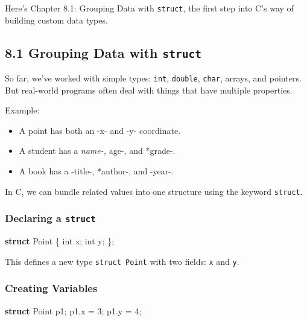 \documentclass[
  letterpaper,
  DIV=11,
  numbers=noendperiod]{scrreprt}
\newenvironment{Shaded}{\begin{snugshade}}{\end{snugshade}}
\newcommand{\DataTypeTok}[1]{\textcolor[rgb]{0.68,0.00,0.00}{#1}}
\newcommand{\DecValTok}[1]{\textcolor[rgb]{0.68,0.00,0.00}{#1}}
\newcommand{\KeywordTok}[1]{\textcolor[rgb]{0.00,0.23,0.31}{\textbf{#1}}}
\newcommand{\NormalTok}[1]{\textcolor[rgb]{0.00,0.23,0.31}{#1}}
\newcommand{\OperatorTok}[1]{\textcolor[rgb]{0.37,0.37,0.37}{#1}}
\providecommand{\tightlist}{%
  \setlength{\itemsep}{0pt}\setlength{\parskip}{0pt}}
\begin{document}
Here's Chapter 8.1: Grouping Data with \texttt{struct}, the first step
into C's way of building custom data types.

\subsection{\texorpdfstring{8.1 Grouping Data with
\texttt{struct}}{8.1 Grouping Data with struct}}\label{grouping-data-with-struct}

So far, we've worked with simple types: \texttt{int}, \texttt{double},
\texttt{char}, arrays, and pointers. But real-world programs often deal
with things that have multiple properties.

Example:

\begin{itemize}
\tightlist
\item
  A point has both an -x- and -y- coordinate.
\item
  A student has a \emph{name-, }age-, and *grade-.
\item
  A book has a -title-, *author-, and -year-.
\end{itemize}

In C, we can bundle related values into one structure using the keyword
\texttt{struct}.

\subsubsection{\texorpdfstring{Declaring a
\texttt{struct}}{Declaring a struct}}\label{declaring-a-struct}

\begin{Shaded}
\begin{Highlighting}[]
\KeywordTok{struct}\NormalTok{ Point }\OperatorTok{\{}
    \DataTypeTok{int}\NormalTok{ x}\OperatorTok{;}
    \DataTypeTok{int}\NormalTok{ y}\OperatorTok{;}
\OperatorTok{\};}
\end{Highlighting}
\end{Shaded}

This defines a new type \texttt{struct\ Point} with two fields:
\texttt{x} and \texttt{y}.

\subsubsection{Creating Variables}\label{creating-variables}

\begin{Shaded}
\begin{Highlighting}[]
\KeywordTok{struct}\NormalTok{ Point p1}\OperatorTok{;}
\NormalTok{p1}\OperatorTok{.}\NormalTok{x }\OperatorTok{=} \DecValTok{3}\OperatorTok{;}
\NormalTok{p1}\OperatorTok{.}\NormalTok{y }\OperatorTok{=} \DecValTok{4}\OperatorTok{;}
\end{Highlighting}
\end{Shaded}
\end{document}
